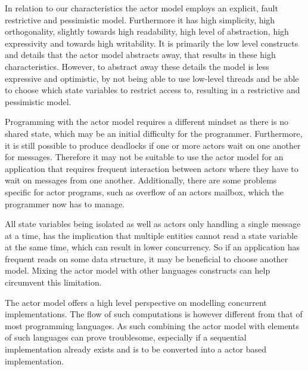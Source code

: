 In relation to our characteristics the actor model employs an explicit, fault restrictive and pessimistic model. Furthermore it has high simplicity, high orthogonality, slightly towards high readability, high level of abstraction, high expressivity and towards high writability. It is primarily the low level constructs and details that the actor model abstracts away, that results in these high characteristics. However, to abstract away these details the model is less expressive and optimistic, by not being able to use low-level threads and be able to choose which state variables to restrict access to, resulting in a restrictive and pessimistic model.

Programming with the actor model requires a different mindset as there is no shared state, which may be an initial difficulty for the programmer. Furthermore, it is still possible to produce deadlocks if one or more actors wait on one another for messages. Therefore it may not be suitable to use the actor model for an application that requires frequent interaction between actors where they have to wait on messages from one another. Additionally, there are some problems specific for actor programs, such as overflow of an actors mailbox, which the programmer now has to manage. 

All state variables being isolated as well as actors only handling a single message at a time, has the implication that multiple entities cannot read a state variable at the same time, which can result in lower concurrency. So if an application has frequent reads on some data structure, it may be beneficial to choose another model. Mixing the actor model with other languages constructs can help circumvent this limitation.%

The actor model offers a high level perspective on modelling concurrent implementations. The flow of such computations is however different from that of most programming languages. As such combining the actor model with elements of such languages can prove troublesome, especially if a sequential implementation already exists and is to be converted into a actor based implementation.


